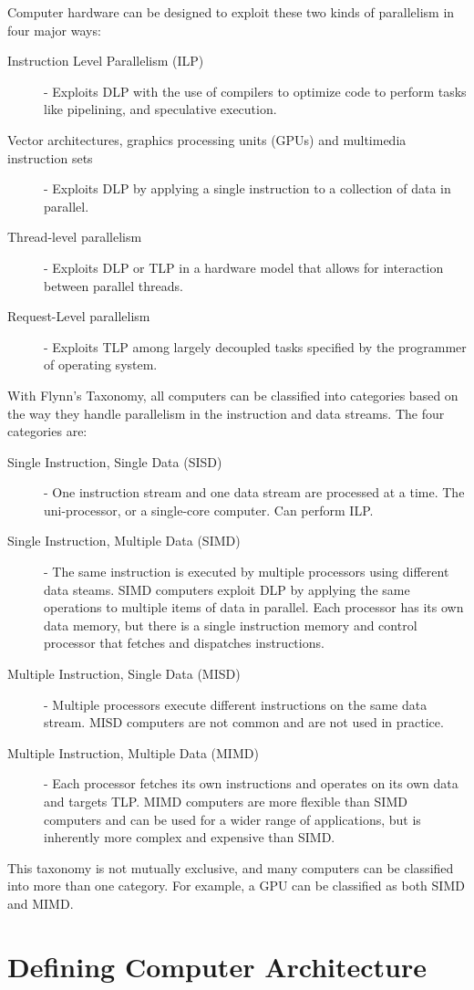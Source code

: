 \documentclass[12pt letter]{report}
\begin{document}
Computer hardware can be designed to exploit these two kinds of parallelism in four major ways:
\begin{description}
  \item[Instruction Level Parallelism (ILP)] - Exploits DLP with the use of compilers to optimize code to perform tasks
        like pipelining, and speculative execution.
  \item[Vector architectures, graphics processing units (GPUs) and multimedia instruction sets] - Exploits DLP by
        applying a single instruction to a collection of data in parallel.
  \item[Thread-level parallelism ] - Exploits DLP or TLP in a hardware model that allows for interaction between
        parallel threads.
  \item[Request-Level parallelism] - Exploits TLP among largely decoupled tasks specified by the programmer of operating
        system.
\end{description}

With Flynn's Taxonomy, all computers can be classified into categories based on the way they handle parallelism in the
instruction and data streams. The four categories are:
\begin{description}
  \item[Single Instruction, Single Data (SISD)]  - One instruction stream and one data stream are processed at a time. The uni-processor, or a single-core computer. Can perform ILP.
  \item[Single Instruction, Multiple Data (SIMD)] - The same instruction is executed by multiple processors using
        different data steams. SIMD computers exploit DLP by applying the same operations to multiple items of data in
        parallel. Each processor has its own data memory, but there is a single instruction memory and control processor
        that fetches and dispatches instructions.
  \item [Multiple Instruction, Single Data (MISD)] - Multiple processors execute different instructions on the same
        data stream. MISD computers are not common and are not used in practice.
  \item[Multiple Instruction, Multiple Data (MIMD)] - Each processor fetches its own instructions and operates on
        its own data and targets TLP. MIMD computers are more flexible than SIMD computers and can be used for a wider
        range of applications, but is inherently more complex and expensive than SIMD.
\end{description}
This taxonomy is not mutually exclusive, and many computers can be classified into more than one category. For example, a GPU can be classified as both SIMD and MIMD.

\chapter{Defining Computer Architecture}
\end{document}
